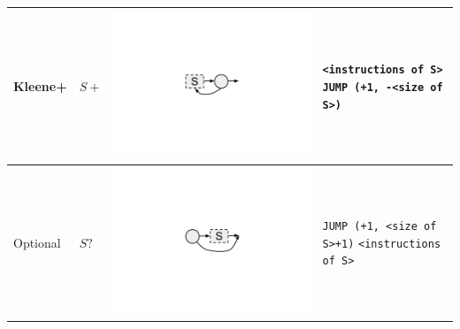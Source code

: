 \documentclass{llncs}
\begin{document}
\begin{table}
\begin{center}
\begin{tabular}{ >{\centering\arraybackslash}m{0.6in} | >{\centering\arraybackslash}m{0.7in} | >{\centering\arraybackslash}m{1.3in} | m{1.8in} }
		\hline
		Kleene+ & $S+$ & \includegraphics[trim=4in 3.7in 4in 3.5in, scale=0.20]{figures/thompson_plus.pdf} &
            \texttt{<instructions of S>} \newline
            \texttt{JUMP (+1, -<size of S>)}
        \\
		\hline
		Optional & $S?$ & \includegraphics[trim=4in 3.7in 4in 3.5in, scale=0.20]{figures/thompson_question.pdf} &
            \texttt{JUMP (+1, <size of S>+1)} \newline
            \texttt{<instructions of S>}
        \\
		\hline

\end{tabular}
\end{center}
\end{table}
\end{document}
